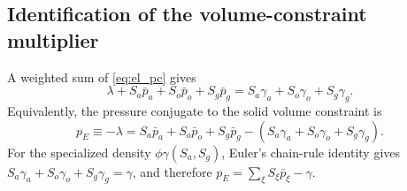 \subsection{Identification of the volume-constraint multiplier}
\label{sec:lambda_identification}

A weighted sum of \eqref{eq:el_pc} gives
\begin{equation}
  \lambda + S_a\bar p_a+S_o\bar p_o+S_g\bar p_g
  = S_a\gamma_a+S_o\gamma_o+S_g\gamma_g .
  \label{eq:lambda_weighted_gamma}
\end{equation}
Equivalently, the pressure conjugate to the solid volume constraint is
\begin{equation}
  p_E \equiv -\lambda
  = S_a\bar p_a+S_o\bar p_o+S_g\bar p_g
    -\left(S_a\gamma_a+S_o\gamma_o+S_g\gamma_g\right).
  \label{eq:equivalent_pore_pressure}
\end{equation}
For the specialized density $\phi\gamma(S_a,S_g)$, Euler's chain-rule identity gives
$S_a\gamma_a+S_o\gamma_o+S_g\gamma_g=\gamma$, and therefore
$p_E=\sum_\xi S_\xi\bar p_\xi-\gamma$.


